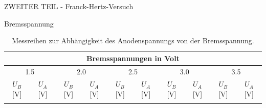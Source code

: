 \begin{appendix}
\begin{chapter}{ZWEITER TEIL - Franck-Hertz-Versuch}
\begin{section}{Bremsspannung}
      \begin{scriptsize}
        \begin{longtable}[htbp]{|c|c|c|c|c|c|c|c|c|c|}
          \hline
          \multicolumn{10}{|c|}{Bremsspannungen in Volt} \\ \hline 
          \multicolumn{2}{|c|}{1.5} & \multicolumn{2}{|c|}{2.0} &
          \multicolumn{2}{|c|}{2.5} & \multicolumn{2}{|c|}{3.0} & 
          \multicolumn{2}{|c|}{3.5} \\ \hline
          $U_{B}$ [V] & $U_{A}$ [V] & $U_{B}$ [V] & $U_{A}$ [V] &
          $U_{B}$ [V] & $U_{A}$ [V] & $U_{B}$ [V] & $U_{A}$ [V] &
          $U_{B}$ [V] & $U_{A}$ [V] \\ \hline\hline \endhead
          
          \caption{Messreihen zur Abhängigkeit des Anodenspannungs von der
              Bremsspannung.}
          \label{tab:FHbremsspannung}
        \end{longtable}
      \end{scriptsize}
    \end{section}
    
    
    

\end{chapter}
\end{appendix}
